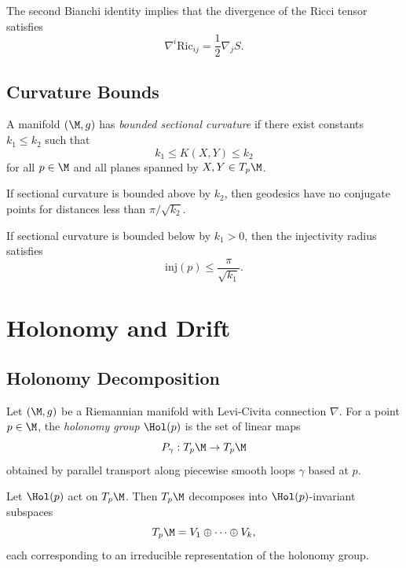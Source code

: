 \begin{lemma}
The second Bianchi identity implies that the divergence of the Ricci
tensor satisfies
\[
\nabla^i \mathrm{Ric}_{ij}
= \frac{1}{2} \nabla_j S.
\]
\end{lemma}

\subsection{Curvature Bounds}

\begin{definition}
A manifold $(\M,g)$ has \emph{bounded sectional curvature} if there exist
constants $k_1 \le k_2$ such that
\[
k_1 \le K(X,Y) \le k_2
\]
for all $p \in \M$ and all planes spanned by $X,Y \in T_p\M$.
\end{definition}

\begin{theorem}
If sectional curvature is bounded above by $k_2$, then geodesics have no
conjugate points for distances less than $\pi/\sqrt{k_2}$.
\end{theorem}

\begin{lemma}
If sectional curvature is bounded below by $k_1 > 0$, then the injectivity
radius satisfies
\[
\mathrm{inj}(p) \le \frac{\pi}{\sqrt{k_1}}.
\]
\end{lemma}

\section{Holonomy and Drift}

\subsection{Holonomy Decomposition}

\begin{definition}
Let $(\M,g)$ be a Riemannian manifold with Levi-Civita connection $\nabla$.
For a point $p \in \M$, the \emph{holonomy group} $\Hol(p)$ is the set of
linear maps
\[
P_\gamma : T_p\M \to T_p\M
\]
obtained by parallel transport along piecewise smooth loops $\gamma$
based at $p$.
\end{definition}

\begin{theorem}
Let $\Hol(p)$ act on $T_p\M$.  
Then $T_p\M$ decomposes into $\Hol(p)$-invariant subspaces
\[
T_p\M = V_1 \oplus \cdots \oplus V_k,
\]
each corresponding to an irreducible representation of the holonomy group.
\end{theorem}

